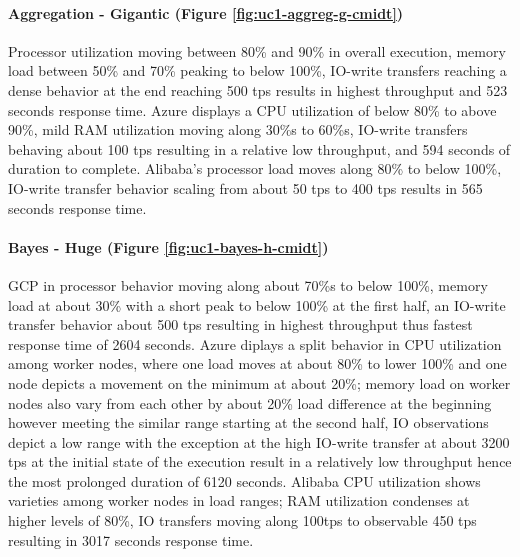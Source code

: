 \documentclass[review]{elsarticle}
\begin{document}
\paragraph{Aggregation - Gigantic (Figure \ref{fig:uc1-aggreg-g-cmidt})}Processor utilization moving between 80\% and 90\% in overall execution, memory load between 50\% and 70\% peaking to below 100\%, IO-write transfers reaching a dense behavior at the end reaching 500 tps results in highest throughput and 523 seconds response time. Azure displays a CPU utilization of below 80\% to above 90\%, mild RAM utilization moving along 30\%s to 60\%s, IO-write transfers behaving about 100 tps resulting in a relative low throughput, and 594 seconds of duration to complete. Alibaba's processor load moves along 80\% to below 100\%, IO-write transfer behavior scaling from about 50 tps to 400 tps results in 565 seconds response time.

\paragraph{Bayes - Huge (Figure \ref{fig:uc1-bayes-h-cmidt})}GCP in processor behavior moving along about 70\%s to below 100\%, memory load at about 30\% with a short peak to below 100\% at the first half, an IO-write transfer behavior about 500 tps resulting in highest throughput thus fastest response time of 2604 seconds. Azure diplays a split behavior in CPU utilization among worker nodes, where one load moves at about 80\% to lower 100\% and one node depicts a movement on the minimum at about 20\%; memory load on worker nodes also vary from each other by about 20\% load difference at the beginning however meeting the similar range starting at the second half, IO observations depict a low range with the exception at the high IO-write transfer at about 3200 tps at the initial state of the execution result in a relatively low throughput hence the most prolonged duration of 6120 seconds. Alibaba CPU utilization shows varieties among worker nodes in load ranges; RAM utilization condenses at higher levels of 80\%, IO transfers moving along 100tps to observable 450 tps resulting in 3017 seconds response time.
\end{document}
